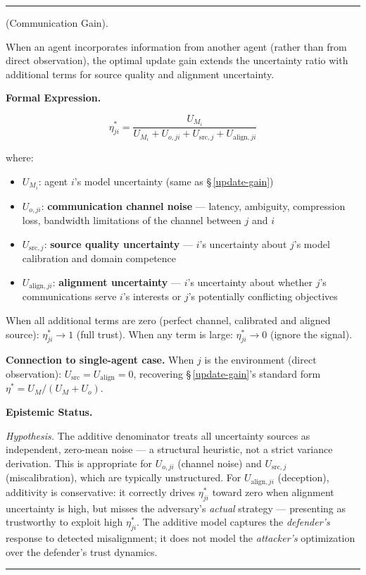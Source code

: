 \documentclass[11pt,oneside]{article}
\newcounter{claim}[section]
\renewcommand{\theclaim}{\thesection.\arabic{claim}}
\newenvironment{segment}[2]{%
  \refstepcounter{claim}%
  \bigskip\noindent\hrule\smallskip
  \noindent{\bfseries #1~\theclaim}\enskip(#2).\par\smallskip
  \noindent\ignorespaces
}{%
  \par\smallskip\noindent\hrule\bigskip
}
\newenvironment{hypothesis}[1][]{\begin{segment}{Hypothesis}{#1}}{\end{segment}}
\begin{document}
\begin{hypothesis}[Communication Gain]
\label{communication-gain}
When an agent incorporates information from another agent (rather than from direct observation), the optimal update gain extends the uncertainty ratio with additional terms for source quality and alignment uncertainty.



\medskip\noindent\textbf{Formal Expression.}



$$\eta_{ji}^* = \frac{U_{M_i}}{U_{M_i} + U_{o,ji} + U_{\text{src},j} + U_{\text{align},ji}}$$

where:
\begin{itemize}
  \item $U_{M_i}$: agent $i$'s model uncertainty (same as \S\,\ref{update-gain})
  \item $U_{o,ji}$: \textbf{communication channel noise} — latency, ambiguity, compression loss, bandwidth limitations of the channel between $j$ and $i$
  \item $U_{\text{src},j}$: \textbf{source quality uncertainty} — $i$'s uncertainty about $j$'s model calibration and domain competence
  \item $U_{\text{align},ji}$: \textbf{alignment uncertainty} — $i$'s uncertainty about whether $j$'s communications serve $i$'s interests or $j$'s potentially conflicting objectives
\end{itemize}


When all additional terms are zero (perfect channel, calibrated and aligned source): $\eta_{ji}^* \to 1$ (full trust). When any term is large: $\eta_{ji}^* \to 0$ (ignore the signal).

\textbf{Connection to single-agent case.} When $j$ is the environment (direct observation): $U_{\text{src}} = U_{\text{align}} = 0$, recovering \S\,\ref{update-gain}'s standard form $\eta^* = U_M / (U_M + U_o)$.


\medskip\noindent\textbf{Epistemic Status.}


\textit{Hypothesis.} The additive denominator treats all uncertainty sources as independent, zero-mean noise — a structural heuristic, not a strict variance derivation. This is appropriate for $U_{o,ji}$ (channel noise) and $U_{\text{src},j}$ (miscalibration), which are typically unstructured. For $U_{\text{align},ji}$ (deception), additivity is conservative: it correctly drives $\eta_{ji}^*$ toward zero when alignment uncertainty is high, but misses the adversary's \textit{actual} strategy — presenting as trustworthy to exploit high $\eta_{ji}^*$. The additive model captures the \textit{defender's} response to detected misalignment; it does not model the \textit{attacker's} optimization over the defender's trust dynamics.


\end{hypothesis}
\end{document}
